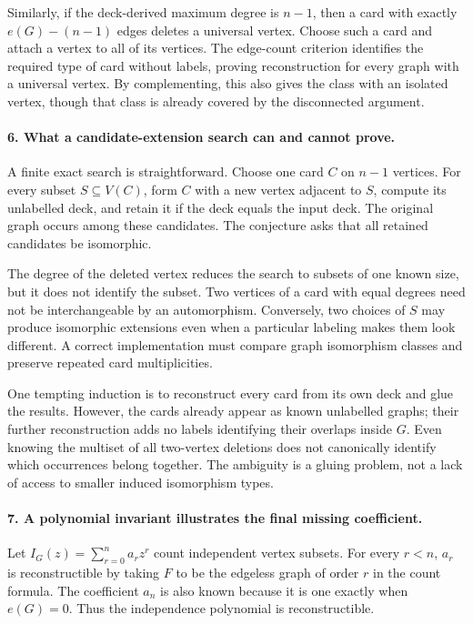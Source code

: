 \documentclass[11pt]{article}
\begin{document}
Similarly, if the deck-derived maximum degree is $n-1$, then a card with exactly $e(G)-(n-1)$ edges deletes a universal vertex. Choose such a card and attach a vertex to all of its vertices. The edge-count criterion identifies the required type of card without labels, proving reconstruction for every graph with a universal vertex. By complementing, this also gives the class with an isolated vertex, though that class is already covered by the disconnected argument.

\paragraph{6. What a candidate-extension search can and cannot prove.}
A finite exact search is straightforward. Choose one card $C$ on $n-1$ vertices. For every subset $S\subseteq V(C)$, form $C$ with a new vertex adjacent to $S$, compute its unlabelled deck, and retain it if the deck equals the input deck. The original graph occurs among these candidates. The conjecture asks that all retained candidates be isomorphic.

The degree of the deleted vertex reduces the search to subsets of one known size, but it does not identify the subset. Two vertices of a card with equal degrees need not be interchangeable by an automorphism. Conversely, two choices of $S$ may produce isomorphic extensions even when a particular labeling makes them look different. A correct implementation must compare graph isomorphism classes and preserve repeated card multiplicities.

One tempting induction is to reconstruct every card from its own deck and glue the results. However, the cards already appear as known unlabelled graphs; their further reconstruction adds no labels identifying their overlaps inside $G$. Even knowing the multiset of all two-vertex deletions does not canonically identify which occurrences belong together. The ambiguity is a gluing problem, not a lack of access to smaller induced isomorphism types.

\paragraph{7. A polynomial invariant illustrates the final missing coefficient.}
Let $I_G(z)=\sum_{r=0}^n a_rz^r$ count independent vertex subsets. For every $r<n$, $a_r$ is reconstructible by taking $F$ to be the edgeless graph of order $r$ in the count formula. The coefficient $a_n$ is also known because it is one exactly when $e(G)=0$. Thus the independence polynomial is reconstructible.
\end{document}
